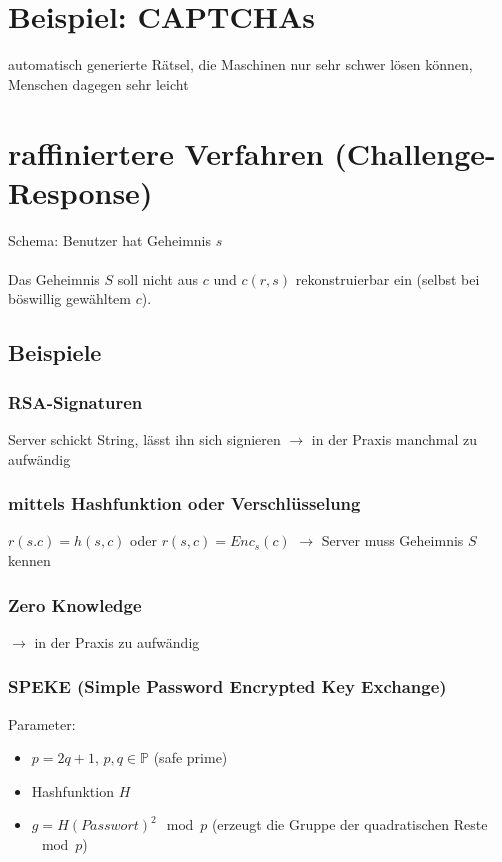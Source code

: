 \documentclass[a4paper,twoside,DIV15,BCOR12mm]{scrbook}
\begin{document}
\section{Beispiel: CAPTCHAs}

automatisch generierte Rätsel, die Maschinen nur sehr schwer lösen können, Menschen dagegen sehr leicht

\section{raffiniertere Verfahren (Challenge-Response)}

Schema: Benutzer hat Geheimnis $s$\\

\\

Das Geheimnis $S$ soll nicht aus $c$ und $c(r,s)$ rekonstruierbar ein (selbst bei böswillig gewähltem $c$).

\subsection{Beispiele}

\subsubsection{RSA-Signaturen} Server schickt String, lässt ihn sich signieren $\rightarrow$ in der Praxis manchmal zu aufwändig
\subsubsection{mittels Hashfunktion oder Verschlüsselung} $r(s.c) = h(s,c)$ oder $r(s,c) = Enc_s(c)$ $\rightarrow$ Server muss Geheimnis $S$ kennen
\subsubsection{Zero Knowledge} $\rightarrow$ in der Praxis zu aufwändig
\subsubsection{SPEKE (Simple Password Encrypted Key Exchange)}

Parameter:

	\begin{itemize}	
		\item $p = 2q + 1$, $p,q \in \mathbb{P}$ (\glqq safe prime\grqq)
		\item Hashfunktion $H$
		\item $g = H(Passwort)^2 \mod{p}$ (erzeugt die Gruppe der quadratischen Reste $\mod{p}$)
	\end{itemize}
	
\end{document}
